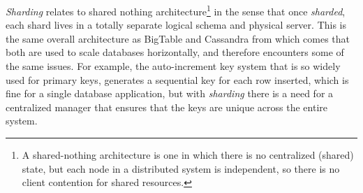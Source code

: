 \emph{Sharding} relates to shared nothing architecture\cite{University86thecase}\footnote{A shared-nothing architecture is one in which there is no centralized (shared) state, but each node in a distributed system is independent, so there is no client contention for shared resources.} in the sense that once \emph{sharded}, each shard lives in a totally separate logical schema and physical server. This is the same overall architecture as BigTable and Cassandra from which comes that both are used to scale databases horizontally, and therefore encounters some of the same issues. For example, the auto-increment key system that is so widely used for primary keys, generates a sequential key for each row inserted, which is fine for a single database application, but with \emph{sharding} there is a need for a centralized manager that ensures that the keys are unique across the entire system.

